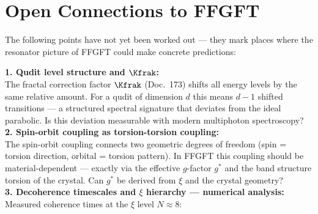 \section{Open Connections to FFGFT}
\label{sec:open-connections}

The following points have not yet been worked out ---
they mark places where the resonator picture of FFGFT
could make concrete predictions:

\begin{significance}
\textbf{1. Qudit level structure and $\Kfrak$:}\\
The fractal correction factor $\Kfrak$ (Doc.~173)
shifts all energy levels by the same relative amount.
For a qudit of dimension $d$ this means
$d-1$ shifted transitions --- a structured
spectral signature that deviates from the ideal parabolic.
Is this deviation measurable with modern
multiphoton spectroscopy?\\[6pt]

\textbf{2. Spin-orbit coupling as torsion-torsion coupling:}\\
The spin-orbit coupling connects two geometric
degrees of freedom (spin = torsion direction,
orbital = torsion pattern). In FFGFT this
coupling should be material-dependent --- exactly via the
effective $g$-factor $g^*$ and the
band structure torsion of the crystal.
Can $g^*$ be derived from $\xi$ and the crystal geometry?\\[6pt]

\textbf{3. Decoherence timescales and $\xi$ hierarchy --- numerical analysis:}\\
Measured coherence times at the $\xi$ level $N \approx 8$:
\begin{center}
{\footnotesize
{}
} %
\end{center}


\end{significance}

